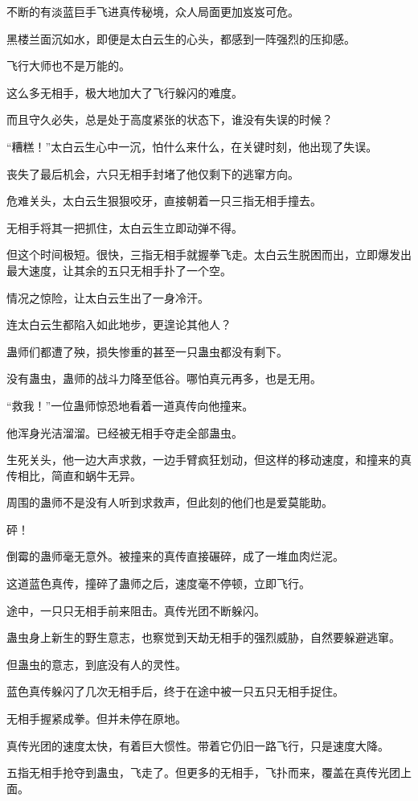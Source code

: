 \begin{this_body}
不断的有淡蓝巨手飞进真传秘境，众人局面更加岌岌可危。

黑楼兰面沉如水，即便是太白云生的心头，都感到一阵强烈的压抑感。

飞行大师也不是万能的。

这么多无相手，极大地加大了飞行躲闪的难度。

而且守久必失，总是处于高度紧张的状态下，谁没有失误的时候？

“糟糕！”太白云生心中一沉，怕什么来什么，在关键时刻，他出现了失误。

丧失了最后机会，六只无相手封堵了他仅剩下的逃窜方向。

危难关头，太白云生狠狠咬牙，直接朝着一只三指无相手撞去。

无相手将其一把抓住，太白云生立即动弹不得。

但这个时间极短。很快，三指无相手就握拳飞走。太白云生脱困而出，立即爆发出最大速度，让其余的五只无相手扑了一个空。

情况之惊险，让太白云生出了一身冷汗。

连太白云生都陷入如此地步，更遑论其他人？

蛊师们都遭了殃，损失惨重的甚至一只蛊虫都没有剩下。

没有蛊虫，蛊师的战斗力降至低谷。哪怕真元再多，也是无用。

“救我！”一位蛊师惊恐地看着一道真传向他撞来。

他浑身光洁溜溜。已经被无相手夺走全部蛊虫。

生死关头，他一边大声求救，一边手臂疯狂划动，但这样的移动速度，和撞来的真传相比，简直和蜗牛无异。

周围的蛊师不是没有人听到求救声，但此刻的他们也是爱莫能助。

砰！

倒霉的蛊师毫无意外。被撞来的真传直接碾碎，成了一堆血肉烂泥。

这道蓝色真传，撞碎了蛊师之后，速度毫不停顿，立即飞行。

途中，一只只无相手前来阻击。真传光团不断躲闪。

蛊虫身上新生的野生意志，也察觉到天劫无相手的强烈威胁，自然要躲避逃窜。

但蛊虫的意志，到底没有人的灵性。

蓝色真传躲闪了几次无相手后，终于在途中被一只五只无相手捉住。

无相手握紧成拳。但并未停在原地。

真传光团的速度太快，有着巨大惯性。带着它仍旧一路飞行，只是速度大降。

五指无相手抢夺到蛊虫，飞走了。但更多的无相手，飞扑而来，覆盖在真传光团上面。


\end{this_body}
